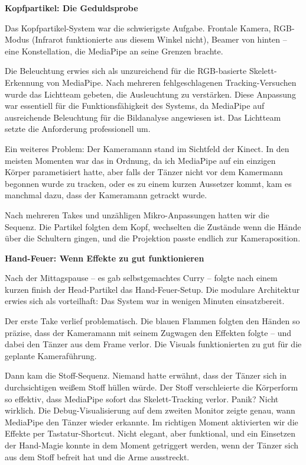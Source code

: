 \newpage

\textbf{Kopfpartikel: Die Geduldsprobe}

\raggedright Das Kopfpartikel-System war die schwierigste Aufgabe. Frontale Kamera, RGB-Modus (Infrarot funktionierte aus diesem Winkel nicht), Beamer von hinten – eine Konstellation, die MediaPipe an seine Grenzen brachte.


Die Beleuchtung erwies sich als unzureichend für die RGB-basierte Skelett-Erkennung von MediaPipe. Nach mehreren fehlgeschlagenen Tracking-Versuchen wurde das Lichtteam gebeten, die Ausleuchtung zu verstärken. Diese Anpassung war essentiell für die Funktionsfähigkeit des Systems, da MediaPipe auf ausreichende Beleuchtung für die Bildanalyse angewiesen ist. Das Lichtteam setzte die Anforderung professionell um.



Ein weiteres Problem: Der Kameramann stand im Sichtfeld der Kinect. In den meisten Momenten war das in Ordnung, da ich MediaPipe auf ein einzigen Körper parametisiert hatte, aber falls der Tänzer nicht vor dem Kamermann begonnen wurde zu tracken, oder es zu einem kurzen Aussetzer kommt, kam es manchmal dazu, dass der Kameramann getrackt wurde.

Nach mehreren Takes und unzähligen Mikro-Anpassungen hatten wir die Sequenz. Die Partikel folgten dem Kopf, wechselten die Zustände wenn die Hände über die Schultern gingen, und die Projektion passte endlich zur Kameraposition.


\newpage

\textbf{Hand-Feuer: Wenn Effekte zu gut funktionieren}

\raggedright Nach der Mittagspause – es gab selbstgemachtes Curry – folgte nach einem kurzen finish der Head-Partikel das Hand-Feuer-Setup. Die modulare Architektur erwies sich als vorteilhaft: Das System war in wenigen Minuten einsatzbereit.


Der erste Take verlief problematisch. Die blauen Flammen folgten den Händen so präzise, dass der Kameramann mit seinem Zugwagen den Effekten folgte – und dabei den Tänzer aus dem Frame verlor. Die Visuals funktionierten zu gut für die geplante Kameraführung.

Dann kam die Stoff-Sequenz. Niemand hatte erwähnt, dass der Tänzer sich in durchsichtigen weißem Stoff hüllen würde. Der Stoff verschleierte die Körperform so effektiv, dass MediaPipe sofort das Skelett-Tracking verlor. Panik? Nicht wirklich. Die Debug-Visualisierung auf dem zweiten Monitor zeigte genau, wann MediaPipe den Tänzer wieder erkannte. Im richtigen Moment aktivierten wir die Effekte per Tastatur-Shortcut. Nicht elegant, aber funktional, und ein Einsetzen der Hand-Magie konnte in dem Moment getriggert werden, wenn der Tänzer sich aus dem Stoff befreit hat und die Arme ausstreckt.




